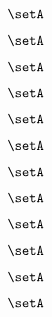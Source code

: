 \begin{forslides}
    \begin{equation}
        \label{eq:slides-processes-158}
        \setA
    \end{equation}

    \begin{equation}
        \label{eq:slides-processes-159}
        \setA
    \end{equation}
    
    \begin{equation}
        \label{eq:slides-processes-160}
        \setA
    \end{equation}

    \begin{equation}
        \label{eq:slides-processes-161}
        \setA
    \end{equation}

    \begin{equation}
        \label{eq:slides-processes-162}
        \setA
    \end{equation}

    \begin{equation}
        \label{eq:slides-processes-163}
        \setA
    \end{equation}

    \begin{equation}
        \label{eq:slides-processes-164}
        \setA
    \end{equation}

    \begin{equation}
        \label{eq:slides-processes-165}
        \setA
    \end{equation}

    \begin{equation}
        \label{eq:slides-processes-166}
        \setA
    \end{equation}

    \begin{equation}
        \label{eq:slides-processes-167}
        \setA
    \end{equation}

    \begin{equation}
        \label{eq:slides-processes-168}
        \setA
    \end{equation}

    \begin{equation}
        \label{eq:slides-processes-169}
        \setA
    \end{equation}
        
        
    \end{forslides}